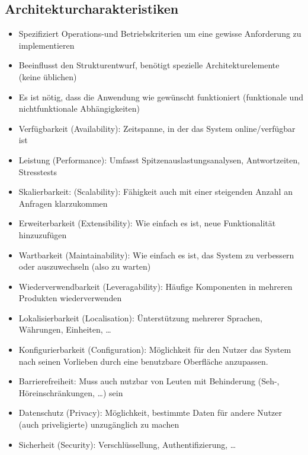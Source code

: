 \documentclass[
    ngerman,
    color=3b,
    summary,
    boxarc,
    main,
]{rubos-tuda-template}
\begin{document}
\subsection{Architekturcharakteristiken}
\begin{definition}[Architekturcharakteristik]\mbox{}
    \begin{itemize}
        \item Spezifiziert Operations-und Betriebskriterien um eine gewisse Anforderung zu implementieren
        \item Beeinflusst den Strukturentwurf, benötigt spezielle Architekturelemente (keine üblichen)
        \item Es ist nötig, dass die Anwendung wie gewünscht funktioniert (funktionale und nichtfunktionale Abhängigkeiten)
    \end{itemize}
\end{definition}
\begin{itemize}
    \item Verfügbarkeit (Availability): Zeitspanne, in der das System online/verfügbar ist
    \item Leistung (Performance): Umfasst Spitzenauslastungsanalysen, Antwortzeiten, Stresstests
    \item Skalierbarkeit: (Scalability): Fähigkeit auch mit einer steigenden Anzahl an Anfragen klarzukommen
\end{itemize}
\begin{itemize}
    \item Erweiterbarkeit (Extensibility): Wie einfach es ist, neue Funktionalität hinzuzufügen
    \item Wartbarkeit (Maintainability): Wie einfach es ist, das System zu verbessern oder auszuwechseln (also zu warten)
    \item Wiederverwendbarkeit (Leveragability): Häufige Komponenten in mehreren Produkten wiederverwenden
    \item Lokalisierbarkeit (Localisation): Ünterstützung mehrerer Sprachen, Währungen, Einheiten, \dots
    \item Konfigurierbarkeit (Configuration): Möglichkeit für den Nutzer das System nach seinen Vorlieben durch eine benutzbare Oberfläche anzupassen.
\end{itemize}
\begin{itemize}
    \item Barrierefreiheit: Muss auch nutzbar von Leuten mit Behinderung (Seh-, Höreinschränkungen, \dots) sein
    \item Datenschutz (Privacy): Möglichkeit, bestimmte Daten für andere Nutzer (auch priveligierte) unzugänglich zu machen
    \item Sicherheit (Security): Verschlüssellung, Authentifizierung, \dots
\end{itemize}
\end{document}
